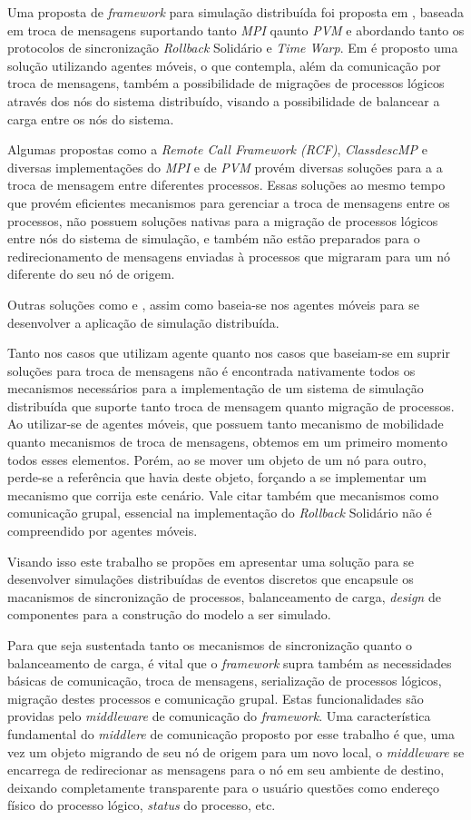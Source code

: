 Uma proposta de \textit{framework} para simulação distribuída foi proposta em \cite{LIVERSON}, baseada em troca de mensagens suportando tanto \textit{MPI} qaunto \textit{PVM} e abordando tanto os protocolos de sincronização \textit{Rollback} Solidário e \textit{Time Warp}. Em \cite{RIBEIROALVES} é proposto uma solução utilizando agentes móveis, o que contempla, além da comunicação por troca de mensagens, também a possibilidade de migrações de processos lógicos através dos nós do sistema distribuído, visando a possibilidade de balancear a carga entre os nós do sistema.

Algumas propostas como a \textit{Remote Call Framework (RCF)}, \textit{ClassdescMP} e diversas implementações do \textit{MPI} e de \textit{PVM} provém diversas soluções para a a troca de mensagem entre diferentes processos. Essas soluções ao mesmo tempo que provém eficientes mecanismos para gerenciar a troca de mensagens entre os processos, não possuem soluções nativas para a migração de processos lógicos entre nós do sistema de simulação, e também não estão preparados para o redirecionamento de mensagens enviadas à processos que migraram para um nó diferente do seu nó de origem.

Outras soluções como \cite{SASSY} e \cite{}, assim como \cite{RIBEIROALVES} baseia-se nos agentes móveis para se desenvolver a aplicação de simulação distribuída.

Tanto nos casos que utilizam agente quanto nos casos que baseiam-se em suprir soluções para troca de mensagens não é encontrada nativamente todos os mecanismos necessários para a implementação de um sistema de simulação distribuída que suporte tanto troca de mensagem quanto migração de processos. Ao utilizar-se de agentes móveis, que possuem tanto mecanismo de mobilidade quanto mecanismos de troca de mensagens, obtemos em um primeiro momento todos esses elementos. Porém, ao se mover um objeto de um nó para outro, perde-se a referência que havia deste objeto, forçando a se implementar um mecanismo que corrija este cenário. Vale citar também que mecanismos como comunicação grupal, essencial na implementação do \textit{Rollback} Solidário não é compreendido por agentes móveis.

Visando isso este trabalho se propões em apresentar uma solução para se desenvolver simulações distribuídas de eventos discretos que encapsule os macanismos de sincronização de processos, balanceamento de carga, \textit{design} de componentes para a construção do modelo a ser simulado.

Para que seja sustentada tanto os mecanismos de sincronização quanto o balanceamento de carga, é vital que o \textit{framework} supra também as necessidades básicas de comunicação, troca de mensagens, serialização de processos lógicos, migração destes processos e comunicação grupal. Estas funcionalidades são providas pelo \textit{middleware} de comunicação do \textit{framework}. Uma característica fundamental do \textit{middlere} de comunicação proposto por esse trabalho é que, uma vez um objeto migrando de seu nó de origem para um novo local, o \textit{middleware} se encarrega de redirecionar as mensagens para o nó em seu ambiente de destino, deixando completamente transparente para o usuário questões como endereço físico do processo lógico, \textit{status} do processo, etc.

